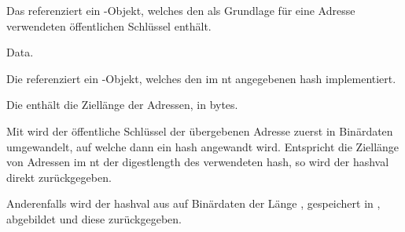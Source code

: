 \begin{description}
	
		Das \javaarg {} referenziert ein -Objekt, welches den
		als Grundlage für eine Adresse verwendeten öffentlichen Schlüssel enthält.
	
		\glsdesc{Data}.
	
		Die \javainstvar {} referenziert ein -Objekt, welches den
		im \gls{nt} angegebenen \gls{hash} implementiert.
	
		Die \javainstvar {} enthält die Ziellänge der Adressen, in bytes.
	
\end{description}

Mit  wird der öffentliche Schlüssel der übergebenen Adresse zuerst in Binärdaten
umgewandelt, auf welche dann ein \gls{hash} angewandt wird. Entspricht die Ziellänge von Adressen im
\gls{nt} der \gls{digestlength} des verwendeten \gls{hash}, so wird der \gls{hashval} 
direkt zurückgegeben.

Anderenfalls wird der \gls{hashval} aus  auf Binärdaten der Länge ,
gespeichert in , abgebildet und diese zurückgegeben.


